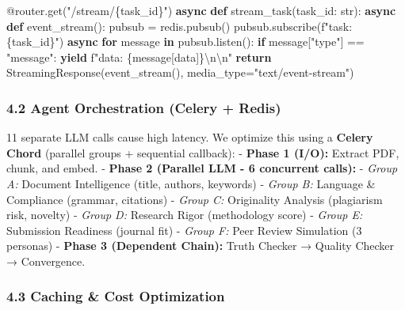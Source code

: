 \documentclass[
]{article}
\newenvironment{Shaded}{}{}
\newcommand{\AttributeTok}[1]{\textcolor[rgb]{0.49,0.56,0.16}{#1}}
\newcommand{\BuiltInTok}[1]{\textcolor[rgb]{0.00,0.50,0.00}{#1}}
\newcommand{\CharTok}[1]{\textcolor[rgb]{0.25,0.44,0.63}{#1}}
\newcommand{\ControlFlowTok}[1]{\textcolor[rgb]{0.00,0.44,0.13}{\textbf{#1}}}
\newcommand{\KeywordTok}[1]{\textcolor[rgb]{0.00,0.44,0.13}{\textbf{#1}}}
\newcommand{\NormalTok}[1]{#1}
\newcommand{\OperatorTok}[1]{\textcolor[rgb]{0.40,0.40,0.40}{#1}}
\newcommand{\SpecialCharTok}[1]{\textcolor[rgb]{0.25,0.44,0.63}{#1}}
\newcommand{\SpecialStringTok}[1]{\textcolor[rgb]{0.73,0.40,0.53}{#1}}
\newcommand{\StringTok}[1]{\textcolor[rgb]{0.25,0.44,0.63}{#1}}
\begin{document}
\begin{Shaded}
\begin{Highlighting}[]
\AttributeTok{@router.get}\NormalTok{(}\StringTok{"/stream/}\SpecialCharTok{\{task\_id\}}\StringTok{"}\NormalTok{)}
\ControlFlowTok{async} \KeywordTok{def}\NormalTok{ stream\_task(task\_id: }\BuiltInTok{str}\NormalTok{):}
    \ControlFlowTok{async} \KeywordTok{def}\NormalTok{ event\_stream():}
\NormalTok{        pubsub }\OperatorTok{=}\NormalTok{ redis.pubsub()}
\NormalTok{        pubsub.subscribe(}\SpecialStringTok{f"task:}\SpecialCharTok{\{}\NormalTok{task\_id}\SpecialCharTok{\}}\SpecialStringTok{"}\NormalTok{)}
        \ControlFlowTok{async} \ControlFlowTok{for}\NormalTok{ message }\KeywordTok{in}\NormalTok{ pubsub.listen():}
            \ControlFlowTok{if}\NormalTok{ message[}\StringTok{"type"}\NormalTok{] }\OperatorTok{==} \StringTok{"message"}\NormalTok{:}
                \ControlFlowTok{yield} \SpecialStringTok{f"data: }\SpecialCharTok{\{}\NormalTok{message[}\StringTok{\textquotesingle{}data\textquotesingle{}}\NormalTok{]}\SpecialCharTok{\}}\CharTok{\textbackslash{}n\textbackslash{}n}\SpecialStringTok{"}
    \ControlFlowTok{return}\NormalTok{ StreamingResponse(event\_stream(), media\_type}\OperatorTok{=}\StringTok{"text/event{-}stream"}\NormalTok{)}
\end{Highlighting}
\end{Shaded}

\subsubsection{4.2 Agent Orchestration (Celery +
Redis)}\label{agent-orchestration-celery-redis}

11 separate LLM calls cause high latency. We optimize this using a
\textbf{Celery Chord} (parallel groups + sequential callback): -
\textbf{Phase 1 (I/O):} Extract PDF, chunk, and embed. - \textbf{Phase 2
(Parallel LLM - 6 concurrent calls):} - \emph{Group A:} Document
Intelligence (title, authors, keywords) - \emph{Group B:} Language \&
Compliance (grammar, citations) - \emph{Group C:} Originality Analysis
(plagiarism risk, novelty) - \emph{Group D:} Research Rigor (methodology
score) - \emph{Group E:} Submission Readiness (journal fit) -
\emph{Group F:} Peer Review Simulation (3 personas) - \textbf{Phase 3
(Dependent Chain):} Truth Checker → Quality Checker → Convergence.

\subsubsection{4.3 Caching \& Cost
Optimization}\label{caching-cost-optimization}
\end{document}
